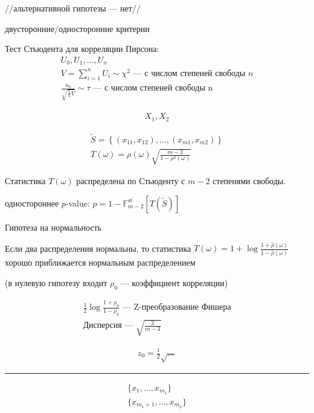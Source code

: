 \documentclass{book}
\begin{document}
//альтернативной гипотезы --- нет//

двусторонние/односторонние критерии

Тест Стьюдента для корреляции Пирсона:
\begin{gather*}
  U_0, U_1, \dots, U_n\\
  V=\sum_{i=1}^{n} {U_i} \sim \chi^2\textrm{ --- с числом степеней свободы $n$}\\
  \frac{u_0}{\sqrt{\frac{1}{n}V}} \sim \tau\textrm{ --- с числом степеней свободы n}
\end{gather*}

\begin{gather*}
  X_1, X_2
\end{gather*}

\begin{gather*}
  \tilde{S}=\left\{(x_{11},x_{12}), \dots, (x_{m1}, x_{m2})\right\}\\
  T(\omega)=\rho(\omega)\sqrt{\frac{m-2}{1-\rho^2(\omega)}}
\end{gather*}

Статистика $T(\omega)$ распределена по Стьюденту с $m-2$ степенями свободы.

одностороннее $p$-value: $p=1-\mathbb{F}^\mathrm{st}_{m-2}[T(\tilde{S})]$

Гипотеза на нормальность

Если два распределения нормальны, то статистика $T(\omega)=1+\log\frac{1+\hat{\rho}(\omega)}{1-\hat{\rho}(\omega)}$ хорошо приближается нормальным распределением 

(в нулевую гипотезу входит $\rho_0$ --- коэффициент корреляции)

\begin{gather*}
  \frac{1}{2}\log \frac{1+\rho_0}{1-\rho_0} \textrm{ --- Z-преобразование Фишера}\\
  \textrm{Дисперсия --- }\sqrt{\frac{2}{m-3}}
\end{gather*}


\begin{gather*}
  z_0=\frac{1}{2}\sqrt{\dots}
\end{gather*}


\hrule

\begin{gather*}
  \{x_1, \dots, x_{m_1}\}\\
  \{x_{m_1+1}, \dots, x_{m_2}\}
\end{gather*}
\end{document}
